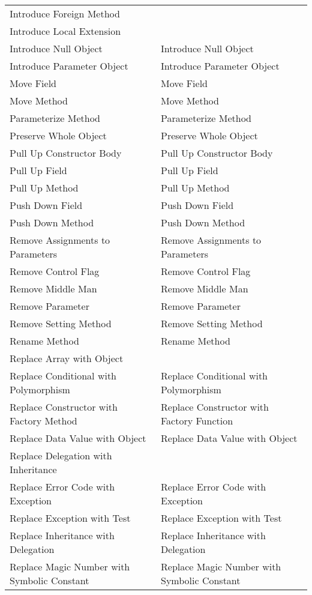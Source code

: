\documentclass[11pt,a4paper,oneside]{book}
\begin{document}
\begin{longtable}{|p{200pt}|p{200pt}|}
    Introduce Foreign Method & \\ 
    Introduce Local Extension & \\ 
    Introduce Null Object & Introduce Null Object\\ 
    Introduce Parameter Object & Introduce Parameter Object\\ 
    Move Field & Move Field\\ 
    Move Method & Move Method\\ 
    Parameterize Method & Parameterize Method\\ 
    Preserve Whole Object & Preserve Whole Object\\ 
    Pull Up Constructor Body & Pull Up Constructor Body\\ 
    Pull Up Field & Pull Up Field\\ 
    Pull Up Method & Pull Up Method\\ 
    Push Down Field & Push Down Field\\ 
    Push Down Method & Push Down Method\\ 
    Remove Assignments to Parameters & Remove Assignments to Parameters \\ 
    Remove Control Flag & Remove Control Flag\\ 
    Remove Middle Man & Remove Middle Man\\ 
    Remove Parameter & Remove Parameter \\ 
    Remove Setting Method & Remove Setting Method\\ 
    Rename Method & Rename Method\\ 
    Replace Array with Object & \\ 
    Replace Conditional with Polymorphism & Replace Conditional with Polymorphism\\ 
    Replace Constructor with Factory Method & Replace Constructor with Factory Function\\ 
    Replace Data Value with Object & Replace Data Value with Object\\ 
    Replace Delegation with Inheritance & \\ 
    Replace Error Code with Exception & Replace Error Code with Exception\\ 
    Replace Exception with Test & Replace Exception with Test\\ 
    Replace Inheritance with Delegation & Replace Inheritance with Delegation\\ 
    Replace Magic Number with Symbolic Constant & Replace Magic Number with Symbolic Constant\\ 

\end{longtable}
\end{document}
